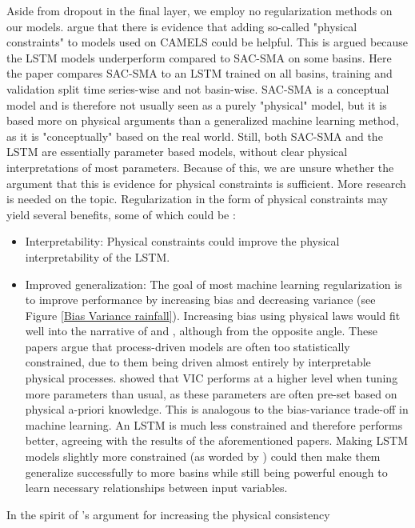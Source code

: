 Aside from dropout in the final layer, we employ no regularization methods on 
our models. \citet{lstm_third_paper} 
argue that there is evidence that adding so-called "physical constraints" to 
models used on CAMELS could be helpful. This is argued because the LSTM models 
underperform compared to SAC-SMA on some basins. Here the paper compares SAC-SMA 
to an LSTM trained on all basins, training and validation split time series-wise 
and not basin-wise. SAC-SMA is a conceptual model and is therefore not usually seen 
as a purely "physical" model, but it is based more on physical arguments than a 
generalized machine learning method, as it is "conceptually" based on the real world.
Still, both SAC-SMA and the LSTM are essentially 
parameter based models, without clear physical interpretations of most parameters. 
Because of this, we are unsure whether the argument that this is evidence for physical 
constraints is sufficient. More research is needed on the topic. Regularization in 
the form of physical constraints may yield several benefits, some of which could be
\citep{hybrid_paper}:
\begin{itemize}
\item Interpretability: Physical constraints could improve the physical interpretability 
of the LSTM.
\item Improved generalization: The goal of most machine learning regularization is 
to improve performance by increasing bias and decreasing variance (see Figure 
\ref{Bias Variance rainfall}). Increasing bias using physical laws would fit well 
into the narrative of \citet{BiasVarianceVIC} and \citet{VICbench}, although from 
the opposite angle. These papers argue that process-driven models are often too 
statistically constrained, due to them being driven almost entirely by interpretable 
physical processes. \citet{VICbench} showed that VIC performs at a higher level 
when tuning more parameters than usual, as these parameters are often pre-set based 
on physical a-priori knowledge. This is analogous to the bias-variance trade-off 
in machine learning. An LSTM is much less constrained and therefore performs better, 
agreeing with the results of the aforementioned papers. Making LSTM models 
slightly more constrained (as worded by \citet{BiasVarianceVIC}) could then make 
them generalize successfully to more basins while still being powerful enough to 
learn necessary relationships between input variables.
\end{itemize}
In the spirit of \citet{hybrid_paper}'s argument for increasing the physical consistency 
